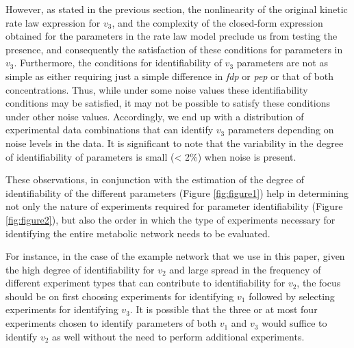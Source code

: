 \documentclass[10pt]{article}
\begin{document}
	However, as stated in the previous section, the nonlinearity of the original kinetic rate law expression for $v_3$, and the complexity of the closed-form expression obtained for the parameters in the rate law model preclude us from testing the presence, and consequently the satisfaction of these conditions for parameters in $v_3$. Furthermore, the conditions for identifiability of $v_3$ parameters are not as simple as either requiring just a simple difference in \textit{fdp} or \textit{pep} or that of both concentrations. Thus, while under some noise values these identifiability conditions may be satisfied, it may not be possible to satisfy these conditions under other noise values. Accordingly, we end up with a distribution of experimental data combinations that can identify $v_3$ parameters depending on noise levels in the data. It is significant to note that the variability in the degree of identifiability of parameters is small (< 2\%) when noise is present.
	
	These observations, in conjunction with the estimation of the degree of identifiability of the different parameters (Figure \ref{fig:figure1}) help in determining not only the nature of experiments required for parameter identifiability (Figure \ref{fig:figure2}), but also the order in which the type of experiments necessary for identifying the entire metabolic network needs to be evaluated.
	
	For instance, in the case of the example network that we use in this paper, given the high degree of identifiability for $v_2$ and large spread in the frequency of different experiment types that can contribute to identifiability for $v_2$, the focus should be on first choosing experiments for identifying $v_1$ followed by selecting experiments for identifying $v_3$. It is possible that the three or at most four experiments chosen to identify parameters of both $v_1$ and $v_3$ would suffice to identify $v_2$ as well without the need to perform additional experiments.	
	
\end{document}
